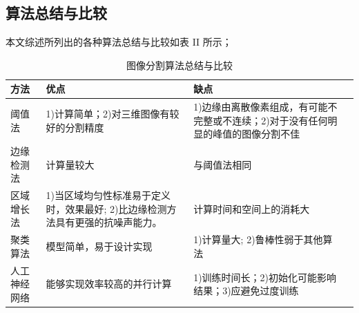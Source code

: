 \documentclass[conference]{IEEEtran}
\begin{document}
\subsection{算法总结与比较}
本文综述所列出的各种算法总结与比较如表 II 所示；
\begin{table}[h]
\begin{threeparttable}
\caption{图像分割算法总结与比较}
\label{Tab2}
\centering
\begin{tabular}{lp{3cm}p{3cm}p{3cm}}
\toprule
 \textbf{方法} & \textbf{优点} & \textbf{缺点}\\
\midrule
    阈值法 & 1)计算简单；2)对三维图像有较好的分割精度 & 1)边缘由离散像素组成，有可能不完整或不连续；2)对于没有任何明显的峰值的图像分割不佳 \\ \hline
\addlinespace
	边缘检测法 & 计算量较大 & 与阈值法相同 \\ \hline
\addlinespace
    区域增长法 & 1)当区域均匀性标准易于定义时，效果最好; 2)比边缘检测方法具有更强的抗噪声能力。 & 计算时间和空间上的消耗大 \\ \hline
    \addlinespace
    聚类算法 & 模型简单，易于设计实现 & 1)计算量大; 2)鲁棒性弱于其他算法\\ \hline
    \addlinespace
    人工神经网络 & 能够实现效率较高的并行计算 & 1)训练时间长；2)初始化可能影响结果；3)应避免过度训练 \\ \hline
\bottomrule

\end{tabular}
\end{threeparttable}
\end{table}
%
%
\end{document}
